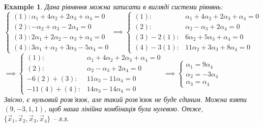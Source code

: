 \documentclass[a4paper, 10pt]{article}
\theoremstyle{theoremdd}
\newtheorem{example}[theorem]{Example}
\begin{document}
\begin{example}
	Дана рівняння можна записати в вигляді системи рівнянь:\\
	$\begin{cases}
	(1): \alpha_1 + 4\alpha_2 + 2\alpha_3 + \alpha_4 = 0\\
	(2): -\alpha_2 + \alpha_3 - 2\alpha_4 = 0\\
	(3): 2\alpha_1 + 2\alpha_2 - \alpha_3 + \alpha_4 = 0\\
	(4): 3\alpha_1 + \alpha_2 + 3\alpha_3 - 5\alpha_4 = 0
	\end{cases} \implies \begin{cases}
	(1): & \alpha_1 + 4\alpha_2 + 2\alpha_3 + \alpha_4 = 0\\
	(2): & \alpha_2 - \alpha_3 + 2\alpha_4 = 0\\
	(3)-2(1): & 6\alpha_2 + 5\alpha_3 + \alpha_4 = 0\\
	(4)-3(1): & 11\alpha_2 + 3\alpha_3 + 8\alpha_4 = 0
	\end{cases}$\\
	
	$\implies \begin{cases}
	(1): & \alpha_1 + 4\alpha_2 + 2\alpha_3 + \alpha_4 = 0\\
	(2): & \alpha_2 - \alpha_3 + 2\alpha_4 = 0\\
	-6(2)+(3): & 11\alpha_3 - 11\alpha_4 = 0\\
	-11(4)+(4): & 14\alpha_3 - 14\alpha_4 = 0
	\end{cases} 
	\implies
	\begin{cases}
	\alpha_1 = 9\alpha_4\\
	\alpha_2 = -3\alpha_4\\
	\alpha_3 = \alpha_4
	\end{cases} 
	$\\
	Звісно, є нульовий розв'язок, але такий розв'язок не буде єдиним. Можна взяти $(9,-3,1,1)$, щоб наша лінійна комбінація була нулевою. Отже, $\{\vec{x}_1,\vec{x}_2,\vec{x}_3,\vec{x}_4\}$ -- л.з.
	\end{example}
	
\end{document}

